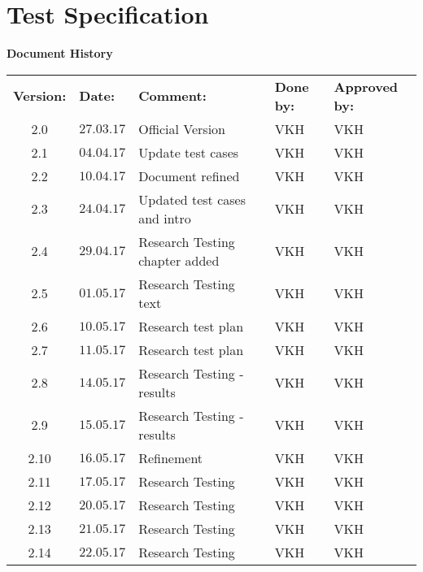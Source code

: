\cleartoleftpage
{
\Hide
\part{Test Specification}
}
\begin{center}
\textbf{\large Document History}
\begin{tabular}{cllll}
\rowcolor{cadetgrey}
\textbf{Version:}    &\textbf{Date:} 	 &\textbf{Comment:}    &\textbf{Done by:}   &\textbf{Approved by:}  \\
2.0    & $27.03.17$    & Official Version & VKH & VKH \\
2.1    & $04.04.17$    & Update test cases & VKH & VKH \\
2.2    & $10.04.17$    & Document refined & VKH & VKH \\
2.3    & $24.04.17$    & Updated test cases and intro & VKH & VKH \\
2.4    & $29.04.17$    & Research Testing chapter added & VKH & VKH\\
2.5    & $01.05.17$    & Research Testing text & VKH & VKH \\
2.6    & $10.05.17$    & Research test plan & VKH & VKH \\
2.7    & $11.05.17$    & Research test plan & VKH & VKH \\
2.8    & $14.05.17$    & Research Testing - results & VKH & VKH \\
2.9    & $15.05.17$    & Research Testing - results & VKH & VKH \\
2.10    & $16.05.17$   & Refinement & VKH & VKH \\
2.11    & $17.05.17$   & Research Testing & VKH & VKH \\
2.12    & $20.05.17$   & Research Testing & VKH & VKH \\
2.13    & $21.05.17$   & Research Testing & VKH & VKH \\
2.14    & $22.05.17$   & Research Testing & VKH & VKH \\
\end{tabular}                                                                   
\end{center}
\vspace*{1 cm}


